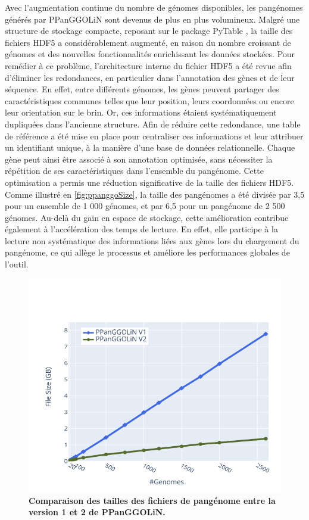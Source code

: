 Avec l’augmentation continue du nombre de génomes disponibles, les pangénomes générés par PPanGGOLiN sont devenus de plus en plus volumineux. Malgré une structure de stockage compacte, reposant sur le package PyTable \cite{team_pytables_2002}, la taille des fichiers HDF5 a considérablement augmenté, en raison du nombre croissant de génomes et des nouvelles fonctionnalités enrichissant les données stockées.
Pour remédier à ce problème, l’architecture interne du fichier HDF5 a été revue afin d’éliminer les redondances, en particulier dans l’annotation des gènes et de leur séquence. En effet, entre différents génomes, les gènes peuvent partager des caractéristiques communes telles que leur position, leurs coordonnées ou encore leur orientation sur le brin. Or, ces informations étaient systématiquement dupliquées dans l’ancienne structure. Afin de réduire cette redondance, une table de référence a été mise en place pour centraliser ces informations et leur attribuer un identifiant unique, à la manière d’une base de données relationnelle. Chaque gène peut ainsi être associé à son annotation optimisée, sans nécessiter la répétition de ses caractéristiques dans l’ensemble du pangénome.
Cette optimisation a permis une réduction significative de la taille des fichiers HDF5. Comme illustré en \autoref{fig:ppanggoSize}, la taille des pangénomes a été divisée par 3,5 pour un ensemble de 1 000 génomes, et par 6,5 pour un pangénome de 2 500 génomes.
Au-delà du gain en espace de stockage, cette amélioration contribue également à l’accélération des temps de lecture. En effet, elle participe à la lecture non systématique des informations liées aux gènes lors du chargement du pangénome, ce qui allège le processus et améliore les performances globales de l’outil.

\begin{figure}
    \centering
    \includegraphics[width=.8\linewidth]{images/benchPPanGGO.png}
    \caption[Taille des fichiers de pangénome entre la version 1 et 2 de PPanGGOLiN]{\textbf{Comparaison des tailles des fichiers de pangénome entre la version 1 et 2 de PPanGGOLiN.}}
    \label{fig:ppanggoSize}
\end{figure}


